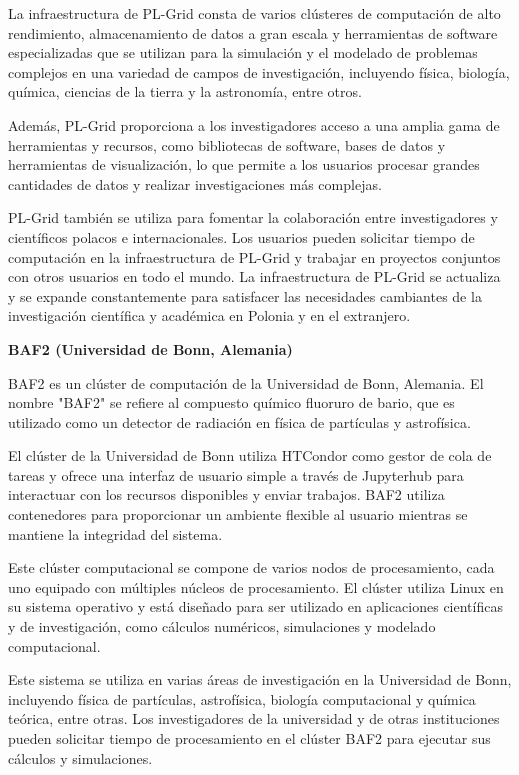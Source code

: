 \begin{spacing}{1.5}
  La infraestructura de PL-Grid consta de varios clústeres de computación de
  alto rendimiento, almacenamiento de datos a gran escala y herramientas de
  software especializadas que se utilizan para la simulación y el modelado de
  problemas complejos en una variedad de campos de investigación, incluyendo
  física, biología, química, ciencias de la tierra y la astronomía, entre otros.

  Además, PL-Grid proporciona a los investigadores acceso a una amplia gama de
  herramientas y recursos, como bibliotecas de software, bases de datos y
  herramientas de visualización, lo que permite a los usuarios procesar grandes
  cantidades de datos y realizar investigaciones más complejas.

  PL-Grid también se utiliza para fomentar la colaboración entre investigadores
  y científicos polacos e internacionales. Los usuarios pueden solicitar tiempo
  de computación en la infraestructura de PL-Grid y trabajar en proyectos
  conjuntos con otros usuarios en todo el mundo. La infraestructura de PL-Grid se
  actualiza y se expande constantemente para satisfacer las necesidades
  cambiantes de la investigación científica y académica en Polonia y en el
  extranjero. \cite{PL} \newline

  \textbf{BAF2 (Universidad de Bonn, Alemania)}

  BAF2 es un clúster de computación de la Universidad de Bonn, Alemania. El
  nombre "BAF2" se refiere al compuesto químico fluoruro de bario, que es
  utilizado como un detector de radiación en física de partículas y astrofísica.

  El clúster de la Universidad de Bonn utiliza HTCondor como gestor de cola de
  tareas y ofrece una interfaz de usuario simple a través de Jupyterhub para
  interactuar con los recursos disponibles y enviar trabajos. BAF2 utiliza
  contenedores para proporcionar un ambiente flexible al usuario mientras se
  mantiene la integridad del sistema.

  Este clúster computacional se compone de varios nodos de procesamiento, cada
  uno equipado con múltiples núcleos de procesamiento. El clúster utiliza Linux
  en su sistema operativo y está diseñado para ser utilizado en aplicaciones
  científicas y de investigación, como cálculos numéricos, simulaciones y
  modelado computacional.

  Este sistema se utiliza en varias áreas de investigación en la Universidad de
  Bonn, incluyendo física de partículas, astrofísica, biología computacional y
  química teórica, entre otras. Los investigadores de la universidad y de otras
  instituciones pueden solicitar tiempo de procesamiento en el clúster BAF2 para
  ejecutar sus cálculos y simulaciones.


\end{spacing}
